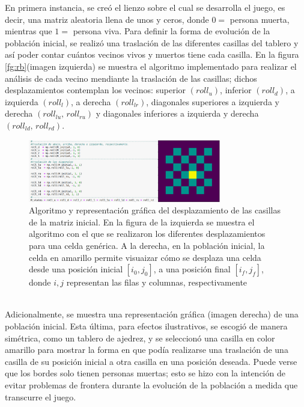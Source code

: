 \documentclass[11pt]{iopart}
\begin{document}
En primera instancia, se creó el lienzo sobre el cual se desarrolla el juego, es decir, una matriz aleatoria llena de unos y ceros, donde $0 = $ persona muerta, mientras que $ 1 = $ persona viva. Para definir la forma de evolución de la población inicial, se realizó una traslación de las diferentes casillas del tablero y así poder contar cuántos vecinos vivos y muertos tiene cada casilla. En la figura \eqref{fg:rb}(imagen izquierda)  se muestra el algoritmo implementado para realizar el análisis de cada vecino mendiante la traslación de las casillas; dichos desplazamientos contemplan los vecinos: superior $(roll_{u})$, inferior $(roll_{d})$, a izquierda $(roll_{l})$, a derecha $(roll_{lr})$, diagonales superiores a izquierda y derecha $(roll_{lu}, \, roll_{ru})$ y diagonales inferiores a izquierda y derecha $(roll_{ld}, \, roll_{rd})$. 
%
\\
\begin{figure}[h!]
\centering
\includegraphics[width = 0.75\textwidth]{Figs/roll_board}
\caption{Algoritmo y representación gráfica del desplazamiento de las casillas de la matriz inicial. En la figura de la izquierda se muestra el algoritmo con el que se realizaron los diferentes desplazamientos para una celda genérica. A la derecha, en la población inicial, la celda en amarillo permite visuaizar cómo se desplaza una celda desde una posición inicial $[i_{0}, j_{0}]$, a una posición final $[i_{f}, j_{f}]$, donde $i , j$ representan las filas y columnas, respectivamente\label{fg:rb}}
\end{figure}
\\
%
Adicionalmente, se muestra una representación gráfica (imagen derecha) de una población inicial. Esta última, para efectos ilustrativos, se escogió de manera simétrica, como un tablero de ajedrez, y se seleccionó una casilla en color amarillo para mostrar la forma en que podía realizarse una traslación de una casilla de su posición inicial a otra casilla en una posición deseada. Puede verse que los bordes solo tienen personas muertas; esto se hizo con la intención de evitar problemas de frontera durante la evolución de la población a medida que transcurre el juego. 
\\ \\
\end{document}
